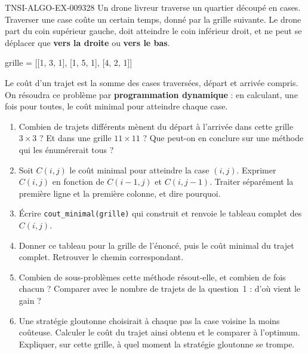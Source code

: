 \begin{exercice}{TNSI-ALGO-EX-009}{3}{28}
Un drone livreur traverse un quartier découpé en cases. Traverser une case coûte
un certain temps, donné par la grille suivante. Le drone part du coin supérieur
gauche, doit atteindre le coin inférieur droit, et ne peut se déplacer que
\textbf{vers la droite} ou \textbf{vers le bas}.
\begin{python}
grille = [[1, 3, 1],
          [1, 5, 1],
          [4, 2, 1]]
\end{python}
Le coût d'un trajet est la somme des cases traversées, départ et arrivée compris.
On résoudra ce problème par \textbf{programmation dynamique} : en calculant, une
fois pour toutes, le coût minimal pour atteindre chaque case.
\begin{enumerate}
  \item Combien de trajets différents mènent du départ à l'arrivée dans cette
    grille $3\times 3$ ? Et dans une grille $11\times 11$ ? Que peut-on en
    conclure sur une méthode qui les énumérerait tous ?
  \item Soit $C(i,j)$ le coût minimal pour atteindre la case $(i,j)$. Exprimer
    $C(i,j)$ en fonction de $C(i-1,j)$ et $C(i,j-1)$. Traiter séparément la
    première ligne et la première colonne, et dire pourquoi.
  \item Écrire \lstinline{cout_minimal(grille)} qui construit et renvoie le
    tableau complet des $C(i,j)$.
  \item Donner ce tableau pour la grille de l'énoncé, puis le coût minimal du
    trajet complet. Retrouver le chemin correspondant.
  \item Combien de sous-problèmes cette méthode résout-elle, et combien de fois
    chacun ? Comparer avec le nombre de trajets de la question~1 : d'où vient le
    gain ?
  \item Une stratégie gloutonne choisirait à chaque pas la case voisine la moins
    coûteuse. Calculer le coût du trajet ainsi obtenu et le comparer à
    l'optimum. Expliquer, sur cette grille, à quel moment la stratégie gloutonne
    se trompe.
\end{enumerate}
\end{exercice}

